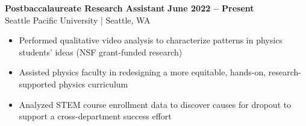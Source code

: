 \textbf{Postbaccalaureate Research Assistant} \hfill \textbf{June 2022 -- Present} \\
    Seattle Pacific University | Seattle, WA
    \squish
    \begin{itemize}
        \item Performed qualitative video analysis to characterize patterns in physics students' ideas (NSF grant-funded research) 
        \item Assisted physics faculty in redesigning a more equitable, hands-on, research-supported physics curriculum
        \item Analyzed STEM course enrollment data to discover causes for dropout to support a cross-department success effort
    \end{itemize}